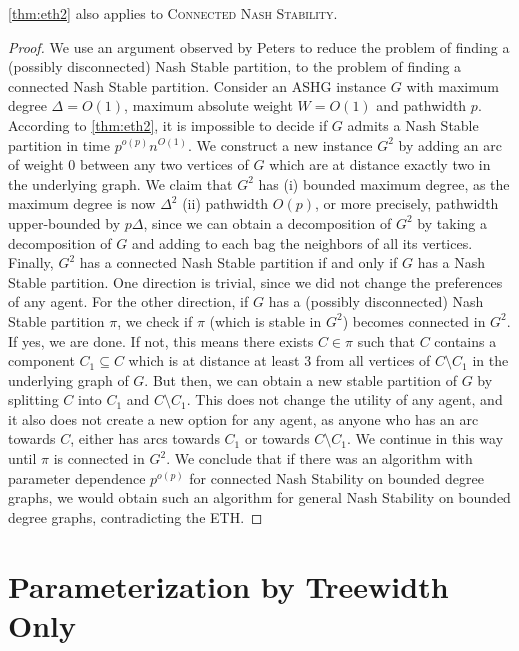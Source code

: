 \documentclass[letterpaper,USenglish,cleveref, autoref, thm-restate]{lipics-v2021}
\begin{document}
\begin{corollary}\label{cor:eth2} \cref{thm:eth2} also applies to
\textsc{Connected Nash Stability}.  \end{corollary}

\begin{proof}

We use an argument observed by Peters \cite{Peters16a} to reduce the problem of
finding a (possibly disconnected) Nash Stable partition, to the problem of
finding a connected Nash Stable partition. Consider an ASHG instance $G$ with
maximum degree $\Delta=O(1)$, maximum absolute weight $W=O(1)$ and pathwidth
$p$.  According to \cref{thm:eth2}, it is impossible to decide if $G$ admits a
Nash Stable partition in time $p^{o(p)}n^{O(1)}$. We construct a new instance
$G^2$ by adding an arc of weight $0$ between any two vertices of $G$ which are
at distance exactly two in the underlying graph. We claim that $G^2$ has (i)
bounded maximum degree, as the maximum degree is now $\Delta^2$ (ii) pathwidth
$O(p)$, or more precisely, pathwidth upper-bounded by $p\Delta$, since we can
obtain a decomposition of $G^2$ by taking a decomposition of $G$ and adding to
each bag the neighbors of all its vertices. Finally, $G^2$ has a connected Nash
Stable partition if and only if $G$ has a Nash Stable partition. One direction
is trivial, since we did not change the preferences of any agent. For the other
direction, if $G$ has a (possibly disconnected) Nash Stable partition $\pi$, we
check if $\pi$ (which is stable in $G^2$) becomes connected in $G^2$. If yes,
we are done. If not, this means there exists $C\in \pi$ such that $C$ contains
a component $C_1\subseteq C$ which is at distance at least $3$ from all
vertices of $C\setminus C_1$ in the underlying graph of $G$. But then, we can
obtain a new stable partition of $G$ by splitting $C$ into $C_1$ and
$C\setminus C_1$. This does not change the utility of any agent, and it also
does not create a new option for any agent, as anyone who has an arc towards
$C$, either has arcs towards $C_1$ or towards $C\setminus C_1$. We continue in
this way until $\pi$ is connected in $G^2$. We conclude that if there was an
algorithm with parameter dependence $p^{o(p)}$ for connected Nash Stability on
bounded degree graphs, we would obtain such an algorithm for general Nash
Stability on bounded degree graphs, contradicting the ETH. \end{proof}


\section{Parameterization by Treewidth Only}\label{sec:tw}
\end{document}
